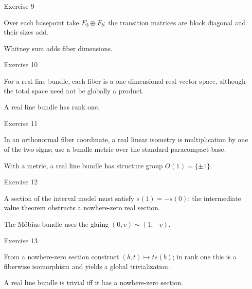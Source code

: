 \begin{exercise}\label{exr:viii30-09}
Exercise 9
\end{exercise}
\begin{hint}
Over each basepoint take \(E_b\oplus F_b\); the transition matrices are block diagonal and their sizes add.
\end{hint}
\begin{solution}
Whitney sum adds fiber dimensions.
\end{solution}

\begin{exercise}\label{exr:viii30-10}
Exercise 10
\end{exercise}
\begin{hint}
For a real line bundle, each fiber is a one-dimensional real vector space, although the total space need not be globally a product.
\end{hint}
\begin{solution}
A real line bundle has rank one.
\end{solution}

\begin{exercise}\label{exr:viii30-11}
Exercise 11
\end{exercise}
\begin{hint}
In an orthonormal fiber coordinate, a real linear isometry is multiplication by one of the two signs; use a bundle metric over the standard paracompact base.
\end{hint}
\begin{solution}
With a metric, a real line bundle has structure group \(O(1)=\{\pm1\}\).
\end{solution}

\begin{exercise}\label{exr:viii30-12}
Exercise 12
\end{exercise}
\begin{hint}
A section of the interval model must satisfy \(s(1)=-s(0)\); the intermediate value theorem obstructs a nowhere-zero real section.
\end{hint}
\begin{solution}
The Möbius bundle uses the gluing \((0,v)\sim(1,-v)\).
\end{solution}

\begin{exercise}\label{exr:viii30-13}
Exercise 13
\end{exercise}
\begin{hint}
From a nowhere-zero section construct \((b,t)\mapsto t s(b)\); in rank one this is a fiberwise isomorphism and yields a global trivialization.
\end{hint}
\begin{solution}
A real line bundle is trivial iff it has a nowhere-zero section.
\end{solution}

